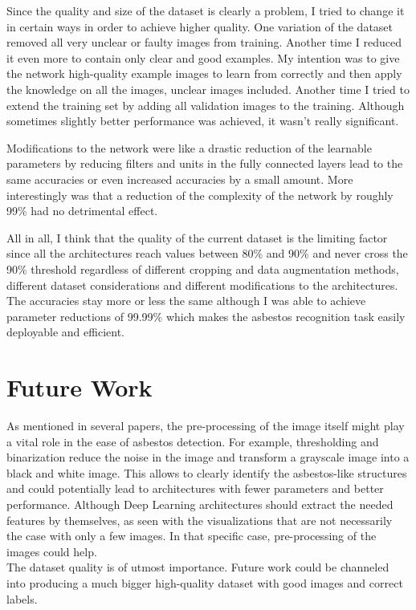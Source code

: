 Since the quality and size of the dataset is clearly a problem, I tried to change it in certain ways in order to achieve higher quality. One variation of the dataset removed all very unclear or faulty images from training. Another time I reduced it even more to contain only clear and good examples. My intention was to give the network high-quality example images to learn from correctly and then apply the knowledge on all the images, unclear images included. Another time I tried to extend the training set by adding all validation images to the training. Although sometimes slightly better performance was achieved, it wasn't really significant.

Modifications to the network were like a drastic reduction of the learnable parameters by reducing filters and units in the fully connected layers lead to the same accuracies or even increased accuracies by a small amount. More interestingly was that a reduction of the complexity of the network by roughly 99\% had no detrimental effect.

All in all, I think that the quality of the current dataset is the limiting factor since all the architectures reach values between 80\% and 90\% and never cross the 90\% threshold regardless of different cropping and data augmentation methods, different dataset considerations and different modifications to the architectures. The accuracies stay more or less the same although I was able to achieve parameter reductions of 99.99\% which makes the asbestos recognition task easily deployable and efficient.

\section{Future Work}

As mentioned in several papers, the pre-processing of the image itself might play a vital role in the ease of asbestos detection. For example, thresholding and binarization reduce the noise in the image and transform a grayscale image into a black and white image. This allows to clearly identify the asbestos-like structures and could potentially lead to architectures with fewer parameters and better performance. Although Deep Learning architectures should extract the needed features by themselves, as seen with the visualizations that are not necessarily the case with only a few images. In that specific case, pre-processing of the images could help.\\

The dataset quality is of utmost importance. Future work could be channeled into producing a much bigger high-quality dataset with good images and correct labels.\\

